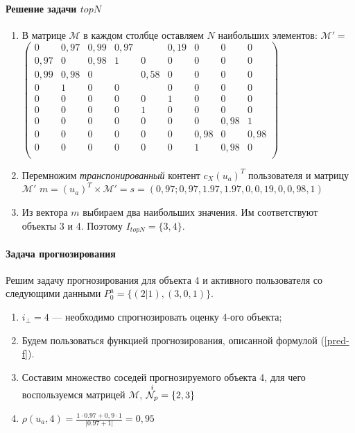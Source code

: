 \paragraph{Решение задачи $topN$}
\begin{enumerate}
\item В матрице $\mathcal{M}$ в каждом столбце оставляем $N$
	наибольших элементов:
$\mathcal{M'} = $
$
\begin{pmatrix}
0    & 0,97 & 0,99   & 0,97 &      & 0,19 & 0 & 0    & 0    \\
0,97 & 0    & 0,98   & 1    &   0  &  0   & 0 & 0    & 0    \\
0,99 & 0,98 & 0      &      & 0,58 & 0    & 0 & 0    & 0    \\
0    & 1    & 0      & 0    &      & 0    & 0 & 0    & 0    \\
0    & 0    & 0      & 0    & 0    & 1    & 0 & 0    & 0    \\
0    & 0    & 0      & 0    & 1    & 0    & 0 & 0    & 0    \\
0    & 0    & 0      & 0    & 0    & 0    & 0 & 0,98 & 1    \\
0    & 0    & 0      & 0    & 0    & 0    & 0,98 & 0 & 0,98    \\
0    & 0    & 0      & 0    & 0    & 0    & 1    & 0,98 & 0    \\
\end{pmatrix}
$
\item Перемножим {\it транспонированный} контент $c_X(u_a)^T$
	пользователя и матрицу $\mathcal{M'}$
		$m = (u_a)^T \times \mathcal{M'} = s = (0,97; 0,97, 1.97, 1.97, 0, 0,19, 0, 0,98, 1)$
\item Из вектора $m$ выбираем два наибольших значения. Им
	соответствуют объекты 3 и 4. Поэтому
		$I_{topN} = \{3, 4\}$.
\end{enumerate}

\paragraph{Задача прогнозирования}
Решим задачу прогнозирования для объекта 4 и активного пользователя со
следующими данными $P^a_0 = \{(2 | 1), (3, 0,1)\}$.
\begin{enumerate}
	\item $i_{\bot} = 4$ --- необходимо спрогнозировать оценку 4-ого объекта;
	\item Будем пользоваться функцией прогнозирования, описанной формулой
		(\ref{pred-f}).
	\item Составим множество соседей прогнозируемого объекта 4, для чего
		воспользуемся матрицей $\mathcal{M}$, ${\overset{i}{\mathcal{N}_p}} = \{2, 3\}$
\item $\rho(u_a, 4) = \frac{1 \cdot 0.97 + 0,9 \cdot 1}{|0.97 + 1|} = 0,95$
\end{enumerate}

